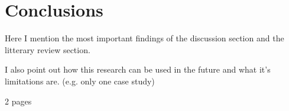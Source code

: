 
\chapter{Conclusions}
\label{chapter:conclusions}

Here I mention the most important findings of the discussion section and the litterary review section.

I also point out how this research can be used in the future and what it's limitations are. (e.g. only one case study)

2 pages 
